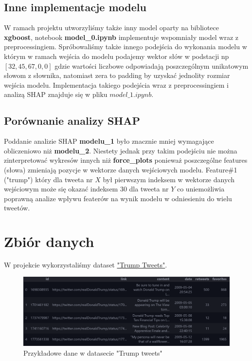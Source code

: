 \documentclass{article}
\begin{document}
\subsection{Inne implementacje modelu}

W ramach projektu utworzyliśmy także inny model oparty na bibliotece \textbf{xgboost}, notebook \textbf{model\_0.ipynb} implementuje wspomniały model wraz z preprocessingiem.
Spróbowaliśmy także innego podejścia do wykonania modelu w którym w ramach wejścia do modelu podajemy wektor słów w podstacji np $[32,45,67,0,0]$ gdzie wartości liczbowe odpowiadają
poszczególnym unikatowym słowom z słownika, natomiast zera to padding by uzyskać jednolity rozmiar wejścia modelu. Implementacja takiego podejścia wraz z preprocessingiem i analizą SHAP znajduje się w pliku $model\_1.ipynb$.

\subsection{Porównanie analizy SHAP}

Poddanie analizie SHAP \textbf{modelu\_1} było znacznie mniej wymagające obliczeniowo niż \textbf{modelu\_2}. Niestety jednak przy takim podejściu nie można zinterpretować wykresów innych niż \textbf{force\_plots} ponieważ poszczególne features (słowa) zmieniają pozycje w wektorze danych wejściowych modelu. Feature\#1 ("trump") który dla tweeta nr $X$ był pierwszym indeksem w wektorze danych wejściowym może się okazać indeksem 30 dla tweeta nr $Y$ co uniemożliwia poprawną analize wpływu featerów na wynik modelu w odniesieniu do wielu tweetów.

\newpage
\section{Zbiór danych}
    W projekcie wykorzystaliśmy dataset \href{https://www.kaggle.com/datasets/austinreese/trump-tweets}{"Trump Tweets"}. 

    \begin{figure}[H]
        \centering
        \includegraphics[width=\textwidth]{dataset_summary.png}
        \caption{Przykładowe dane w datasecie "Trump tweets"}
    \end{figure}
\end{document}
